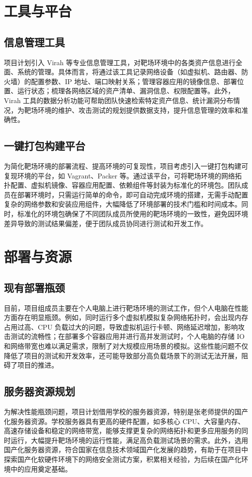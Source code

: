 \documentclass[lang=cn,10pt]{elegantbook}
\begin{document}
\section{工具与平台}
\subsection{信息管理工具}
项目计划引入 Virah 等专业信息管理工具，对靶场环境中的各类资产信息进行全面、系统的管理。具体而言，将通过该工具记录网络设备（如虚拟机、路由器、防火墙）的配置参数、IP 地址、端口映射关系；管理容器应用的镜像信息、部署位置、运行状态；梳理各网络区域的资产清单、漏洞信息、权限配置等。此外，Virah 工具的数据分析功能可帮助团队快速检索特定资产信息、统计漏洞分布情况，为靶场环境的维护、攻击测试的规划提供数据支持，提升信息管理的效率和准确性。

\subsection{一键打包构建平台}
为简化靶场环境的部署流程、提高环境的可复现性，项目考虑引入一键打包构建可复现环境的平台，如 Vagrant、Packer 等。通过该平台，可将靶场环境的网络拓扑配置、虚拟机镜像、容器应用配置、依赖组件等封装为标准化的环境包。团队成员在部署环境时，只需运行简单的命令，即可自动完成环境的搭建，无需手动配置复杂的网络参数和安装应用组件，大幅降低了环境部署的技术门槛和时间成本。同时，标准化的环境包确保了不同团队成员所使用的靶场环境的一致性，避免因环境差异导致的测试结果偏差，便于团队成员协同进行测试和开发工作。

\section{部署与资源}
\subsection{现有部署瓶颈}
目前，项目组成员主要在个人电脑上进行靶场环境的测试工作，但个人电脑在性能方面存在明显瓶颈。例如，同时运行多个虚拟机模拟复杂网络拓扑时，会出现内存占用过高、CPU 负载过大的问题，导致虚拟机运行卡顿、网络延迟增加，影响攻击测试的流畅性；在部署多个容器应用并进行高并发测试时，个人电脑的存储 IO 和网络带宽也难以满足需求，限制了对大规模应用场景的模拟。这些性能问题不仅降低了项目的测试和开发效率，还可能导致部分高负载场景下的测试无法开展，阻碍了项目的推进。

\subsection{服务器资源规划}
为解决性能瓶颈问题，项目计划借用学校的服务器资源，特别是张老师提供的国产化服务器资源。学校服务器具有更高的硬件配置，如多核心 CPU、大容量内存、高速存储设备和稳定的网络带宽，能够支撑更复杂的网络拓扑和更多应用服务的同时运行，大幅提升靶场环境的运行性能，满足高负载测试场景的需求。此外，选用国产化服务器资源，符合国家在信息技术领域国产化发展的趋势，有助于在项目中探索国产化软硬件环境下的网络安全测试方案，积累相关经验，为后续在国产化环境中的应用奠定基础。
\end{document}
